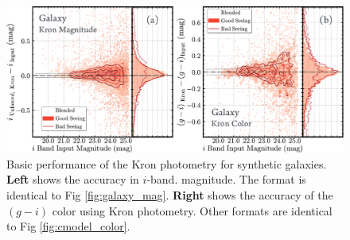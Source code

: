\documentclass[useamsfonts]{pasj01}
\begin{document}
\begin{figure}
    \begin{center}
        \includegraphics[width=\textwidth]{fig/synpipe_galaxy_kron}
    \end{center}
    \caption{
        Basic performance of the Kron photometry for synthetic galaxies. 
        \textbf{Left} shows the accuracy in $i$-band. 
        magnitude. The format is identical to Fig \ref{fig:galaxy_mag}.
        \textbf{Right} shows the accuracy of the $(g-i)$ color using 
        Kron photometry. 
        Other formats are identical to Fig \ref{fig:cmodel_color}.
        }
    \label{fig:galaxy_kron}
\end{figure}
\end{document}
